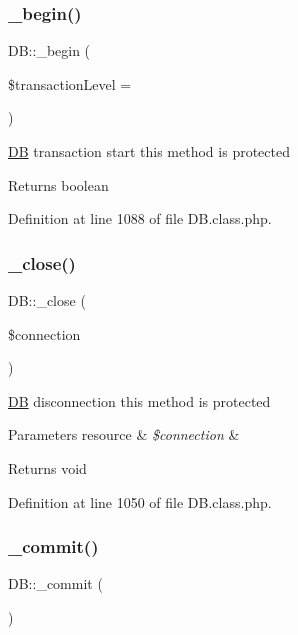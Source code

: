 \subsubsection{\texorpdfstring{\+\_\+begin()}{\_begin()}}
{\footnotesize\ttfamily D\+B\+::\+\_\+begin (\begin{DoxyParamCaption}\item[{}]{\$transaction\+Level = {} }\end{DoxyParamCaption})}

\hyperlink{classDB}{DB} transaction start this method is protected \begin{DoxyReturn}{Returns}
boolean 
\end{DoxyReturn}


Definition at line 1088 of file D\+B.\+class.\+php.

\mbox{\label{classDB_a8c161612a558f47fb008dec4b46ee05c}} 
\subsubsection{\texorpdfstring{\+\_\+close()}{\_close()}}
{\footnotesize\ttfamily D\+B\+::\+\_\+close (\begin{DoxyParamCaption}\item[{}]{\$connection }\end{DoxyParamCaption})}

\hyperlink{classDB}{DB} disconnection this method is protected 
\begin{DoxyParams}[1]{Parameters}
resource & {\em \$connection} & \\
\hline
\end{DoxyParams}
\begin{DoxyReturn}{Returns}
void 
\end{DoxyReturn}


Definition at line 1050 of file D\+B.\+class.\+php.

\mbox{\label{classDB_ae6b44dc80d78b7f73cb6741ff0d63399}} 
\subsubsection{\texorpdfstring{\+\_\+commit()}{\_commit()}}
{\footnotesize\ttfamily D\+B\+::\+\_\+commit (\begin{DoxyParamCaption}{ }\end{DoxyParamCaption})}

